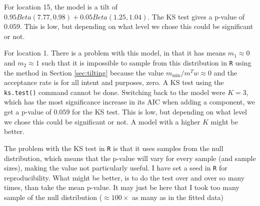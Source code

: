 For location 15, the model is a tilt of $0.95Beta(7.77,0.98) + 0.05Beta(1.25,1.04)$. The KS test gives a p-value of $0.059$. This is low, but depending on what level we chose this could be significant or not.


For location 1.
There is a problem with this model, in that it has means $m_1 \approx 0$ and $m_2 \approx 1$ such that it is impossible to sample from this distribution in \texttt{R} using the method in Section \ref{sec:tilting} because the value $m_{\min}/m^Tw \approx 0$ and the acceptance rate is for all intent and purposes, zero. A KS test using the \texttt{ks.test()} command cannot be done.
Switching back to the model were $K=3$, which has the most significance increase in its AIC when adding a component, we get a p-value of $0.059$ for the KS test. This is low, but depending on what level we chose this could be significant or not.
A model with a higher $K$ might be better.


The problem with the KS test in \texttt{R} is that it uses samples from the null distribution, which means that the p-value will vary for every sample (and sample sizes), making the value not particularly useful. I have set a seed in \texttt{R} for reproducibility. What might be better, is to do the test over and over so many times, than take the mean p-value. It may just be here that I took too many sample of the null distribution ($\approx 100 \times$ as many as in the fitted data)